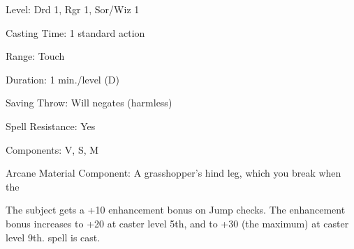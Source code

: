 
\begin{description*}
\item[Level:] Drd 1, Rgr 1, Sor/Wiz 1
\item[Casting Time:] 1 standard action
\item[Range:] Touch
\item[Duration:] 1 min./level (D)
\item[Saving Throw:] Will negates (harmless)
\item[Spell Resistance:] Yes
\item[Components:] V, S, M
\item[Arcane Material Component:] A grasshopper's hind leg, which you break when the
\end{description*}

The subject gets a +10 enhancement bonus on Jump checks. The enhancement bonus
increases to +20 at caster level 5th, and to +30 (the maximum) at caster level
9th.
spell is cast.